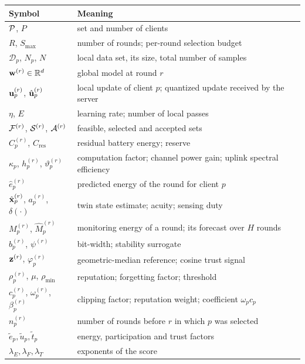 \begin{table}[t]
	\centering
	\label{tab:notation}
	\footnotesize
	\setlength{\tabcolsep}{3pt}
	\begin{tabularx}{\columnwidth}{l >{\raggedright\arraybackslash}X}
		\toprule
		\textbf{Symbol} & \textbf{Meaning} \\
		\midrule
		$\mathcal{P}$, $P$ & set and number of clients \\
		$R$, $S_{\max}$ & number of rounds; per-round selection budget \\
		$\mathcal{D}_p$, $N_p$, $N$ & local data set, its size, total number of samples \\
		$\mathbf{w}^{(r)}\in\mathbb{R}^d$ & global model at round $r$ \\
		$\mathbf{u}_p^{(r)}$, $\hat{\mathbf{u}}_p^{(r)}$ & local update of client $p$; quantized update received by the server \\
		$\eta$, $E$ & learning rate; number of local passes \\
		$\mathcal{F}^{(r)}$, $\mathcal{S}^{(r)}$, $\mathcal{A}^{(r)}$ & feasible, selected and accepted sets \\
		$C_p^{(r)}$, $C_{\mathrm{res}}$ & residual battery energy; reserve \\
		$\kappa_p$, $h_p^{(r)}$, $\vartheta_p^{(r)}$ & computation factor; channel power gain; uplink spectral efficiency \\
		$\hat e_p^{(r)}$ & predicted energy of the round for client $p$ \\
		$\hat{\mathbf{x}}_p^{(r)}$, $a_p^{(r)}$, $\delta(\cdot)$ & twin state estimate; acuity; sensing duty \\
		$M_p^{(r)}$, $\widehat{M}_p^{(r)}$ & monitoring energy of a round; its forecast over $H$ rounds \\
		$b_p^{(r)}$, $\psi^{(r)}$ & bit-width; stability surrogate \\
		$\mathbf{z}^{(r)}$, $\varphi_p^{(r)}$ & geometric-median reference; cosine trust signal \\
		$\rho_p^{(r)}$, $\mu$, $\rho_{\min}$ & reputation; forgetting factor; threshold \\
		$c_p^{(r)}$, $\omega_p^{(r)}$, $\beta_p^{(r)}$ & clipping factor; reputation weight; coefficient $\omega_p c_p$ \\
		$n_p^{(r)}$ & number of rounds before $r$ in which $p$ was selected \\
		$\tilde e_p,\tilde u_p,\tilde t_p$ & energy, participation and trust factors \\
		$\lambda_E,\lambda_F,\lambda_T$ & exponents of the score \\
		\bottomrule
	\end{tabularx}
\end{table}

